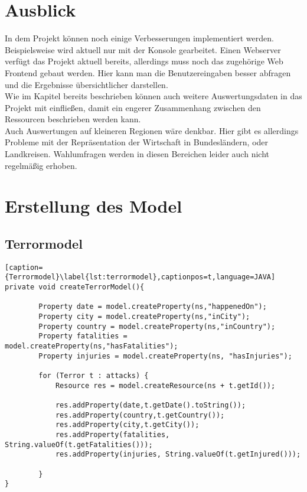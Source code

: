 \documentclass[a4paper,10pt,parskip]{article}
\begin{document}
\section{Ausblick}

In dem Projekt können noch einige Verbesserungen implementiert werden.\\
Beispielsweise wird aktuell nur mit der Konsole gearbeitet. Einen Webserver verfügt das Projekt aktuell bereits, allerdings muss noch das zugehörige Web Frontend gebaut werden. Hier kann man die Benutzereingaben besser abfragen und die Ergebnisse übersichtlicher darstellen.\\
Wie im Kapitel  bereits beschrieben können auch weitere Auswertungsdaten in das Projekt mit einfließen, damit ein engerer Zusammenhang zwischen den Ressourcen beschrieben werden kann.\\
Auch Auswertungen auf kleineren Regionen wäre denkbar. Hier gibt es allerdings Probleme mit der Repräsentation der Wirtschaft in Bundesländern, oder Landkreisen. Wahlumfragen werden in diesen Bereichen leider auch nicht regelmäßig erhoben.


\newpage

\appendix 
\section{Erstellung des Model}\label{model}
\subsection{Terrormodel}
\begin{lstlisting}[caption={Terrormodel}\label{lst:terrormodel},captionpos=t,language=JAVA]
private void createTerrorModel(){

        Property date = model.createProperty(ns,"happenedOn");
        Property city = model.createProperty(ns,"inCity");
        Property country = model.createProperty(ns,"inCountry");
        Property fatalities = model.createProperty(ns,"hasFatalities");
        Property injuries = model.createProperty(ns, "hasInjuries");

        for (Terror t : attacks) {
            Resource res = model.createResource(ns + t.getId());

            res.addProperty(date,t.getDate().toString());
            res.addProperty(country,t.getCountry());
            res.addProperty(city,t.getCity());
            res.addProperty(fatalities, String.valueOf(t.getFatalities()));
            res.addProperty(injuries, String.valueOf(t.getInjured()));

        }
}
\end{lstlisting}
\end{document}

